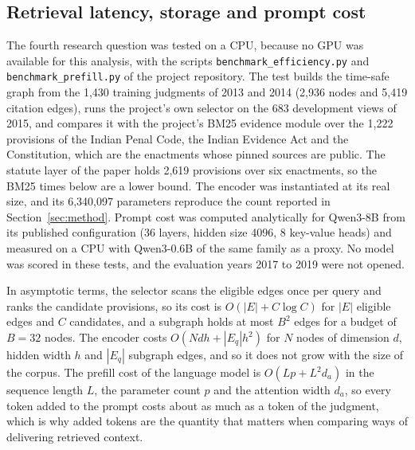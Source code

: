 \documentclass[journal]{IEEEtran}
\begin{document}
\subsection{Retrieval latency, storage and prompt cost}\label{sec:efficiency}
The fourth research question was tested on a CPU, because no GPU was available for this analysis, with the scripts \texttt{benchmark\_efficiency.py} and \texttt{benchmark\_prefill.py} of the project repository. The test builds the time-safe graph from the 1,430 training judgments of 2013 and 2014 (2,936 nodes and 5,419 citation edges), runs the project's own selector on the 683 development views of 2015, and compares it with the project's BM25 evidence module over the 1,222 provisions of the Indian Penal Code, the Indian Evidence Act and the Constitution, which are the enactments whose pinned sources are public. The statute layer of the paper holds 2,619 provisions over six enactments, so the BM25 times below are a lower bound. The encoder was instantiated at its real size, and its 6,340,097 parameters reproduce the count reported in Section~\ref{sec:method}. Prompt cost was computed analytically for Qwen3-8B from its published configuration (36 layers, hidden size 4096, 8 key-value heads) and measured on a CPU with Qwen3-0.6B of the same family as a proxy. No model was scored in these tests, and the evaluation years 2017 to 2019 were not opened.

In asymptotic terms, the selector scans the eligible edges once per query and ranks the candidate provisions, so its cost is $O(|E|+C\log C)$ for $|E|$ eligible edges and $C$ candidates, and a subgraph holds at most $B^2$ edges for a budget of $B=32$ nodes. The encoder costs $O(Ndh+|E_q|h^2)$ for $N$ nodes of dimension $d$, hidden width $h$ and $|E_q|$ subgraph edges, and so it does not grow with the size of the corpus. The prefill cost of the language model is $O(Lp+L^2d_a)$ in the sequence length $L$, the parameter count $p$ and the attention width $d_a$, so every token added to the prompt costs about as much as a token of the judgment, which is why added tokens are the quantity that matters when comparing ways of delivering retrieved context.
\end{document}

